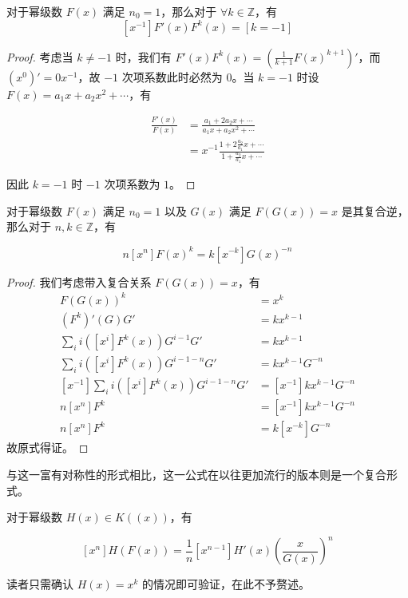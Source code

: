 \begin{lemma}[形式留数]
对于幂级数 $F(x)$ 满足 $n_0 = 1$，那么对于 $\forall k\in \mathbb Z$，有
$$
[x^{-1}]F'(x)F^k(x)=[k=-1]
$$
\end{lemma}

\begin{proof} 考虑当 $k\neq -1$ 时，我们有 $F'(x)F^k(x)=(\frac 1{k+1} F(x)^{k+1})'$，而 $(x^0)'=0x^{-1}$，故 $-1$ 次项系数此时必然为 $0$。当 $k=-1$ 时设 $F(x) = a_1 x + a_2 x^2 + \cdots$，有

\begin{align*}
\frac{F'(x)}{F(x)} &= \frac{a_1 + 2a_2x + \cdots}{a_1 x + a_2 x^2 + \cdots}\\
&= x^{-1} \frac{1 + 2\frac{a_2}{a_1} x + \cdots}{1 + \frac{a_2}{a_1} x + \cdots}
\end{align*}

因此 $k=-1$ 时 $-1$ 次项系数为 $1$。
\end{proof}
\begin{theorem}[Lagrange 反演]
对于幂级数 $F(x)$ 满足 $n_0 = 1$ 以及 $G(x)$ 满足 $F(G(x))=x$ 是其复合逆，那么对于 $n,k\in \mathbb Z$，有

$$
n[x^n]F(x)^k = k[x^{-k}]G(x)^{-n}
$$
\end{theorem}

\begin{proof}
我们考虑带入复合关系 $F(G(x))=x$，有
\begin{align*}
F(G(x))^k &= x^k\\
(F^k)'(G)G' &= kx^{k-1}\\
\sum_{i} i([x^i] F^k(x)) G^{i-1}G' &= kx^{k-1}\\
\sum_{i} i([x^i] F^k(x)) G^{i-1-n}G' &= kx^{k-1}G^{-n}\\ 
[x^{-1}]\sum_{i} i([x^i] F^k(x)) G^{i-1-n}G' &= [x^{-1}]kx^{k-1}G^{-n}\\ 
n[x^n] F^k &= [x^{-1}]kx^{k-1}G^{-n}\\ 
n[x^n] F^k &= k[x^{-k}]G^{-n}
\end{align*}
故原式得证。
\end{proof}

与这一富有对称性的形式相比，这一公式在以往更加流行的版本则是一个复合形式。

\begin{lemma}
对于幂级数 $H(x) \in K((x))$，有

$$
[x^n]H(F(x)) = \frac 1n [x^{n-1}] H'(x) \left(\frac x{G(x)}\right)^n
$$
\end{lemma}

读者只需确认 $H(x) = x^k$ 的情况即可验证，在此不予赘述。

